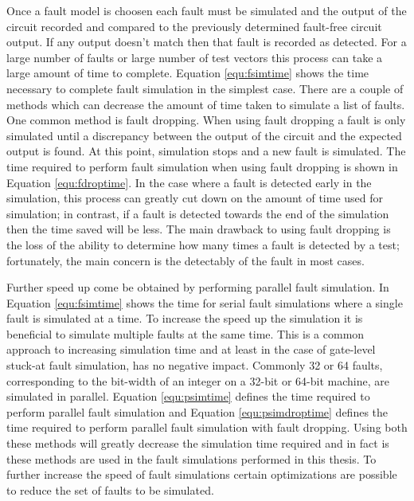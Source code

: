 \documentclass[12pt]{report}
\begin{document}
Once a fault model is choosen each fault must be simulated and the output of the circuit recorded and compared to the previously determined fault-free circuit output.  If any output doesn't match then that fault is recorded as detected.  For a large number of faults or large number of test vectors this process can take a large amount of time to complete. Equation \ref{equ:fsimtime} shows the time necessary to complete fault simulation in the simplest case.  There are a couple of methods which can decrease the amount of time taken to simulate a list of faults.  One common method is fault dropping\cite{needed}.  When using fault dropping a fault is only simulated until a discrepancy between the output of the circuit and the expected output is found.  At this point, simulation stops and a new fault is simulated.  The time required to perform fault simulation when using fault dropping is shown in Equation \ref{equ:fdroptime}.  In the case where a fault is detected early in the simulation, this process can greatly cut down on the amount of time used for simulation; in contrast, if a fault is detected towards the end of the simulation then the time saved will be less.  The main drawback to using fault dropping is the loss of the ability to determine how many times a fault is detected by a test; fortunately, the main concern is the detectably of the fault in most cases\cite{needed-faultdrop}. 

Further speed up come be obtained by performing parallel fault simulation.  In Equation \ref{equ:fsimtime} shows the time for serial fault simulations where a single fault is simulated at a time.  To increase the speed up the simulation it is beneficial to simulate multiple faults at the same time.  This is a common approach to increasing simulation time and at least in the case of gate-level stuck-at fault simulation, has no negative impact.  Commonly 32 or 64 faults, corresponding to the bit-width of an integer on a 32-bit or 64-bit machine, are simulated in parallel.  Equation \ref{equ:psimtime} defines the time required to perform parallel fault simulation and Equation \ref{equ:psimdroptime} defines the time required to perform parallel fault simulation with fault dropping.  Using both these methods will greatly decrease the simulation time required and in fact is these methods are used in the fault simulations performed in this thesis.  To further increase the speed of fault simulations certain optimizations are possible to reduce the set of faults to be simulated.
\end{document}
